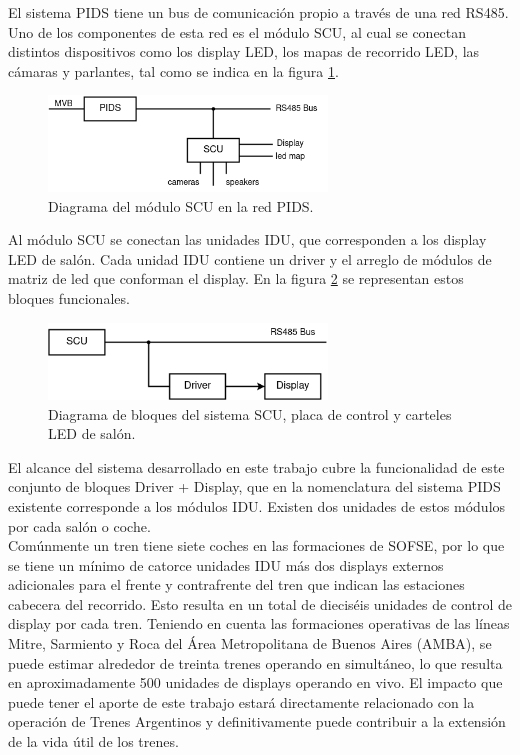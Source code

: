 El sistema PIDS tiene un bus de comunicación propio a través de una red RS485. Uno de los componentes de esta red es el módulo SCU, al cual se conectan distintos dispositivos como los display LED, los mapas de recorrido LED, las cámaras y parlantes, tal como se indica en la figura 	\ref{fig:diagPidsScuDevices}.\\


\begin{figure}[ht]
	\centering
	\includegraphics[width=0.66\textwidth]{./Figures/diagPidsScuDevices.png}
	\caption{Diagrama del módulo SCU en la red PIDS.}
	\label{fig:diagPidsScuDevices}
\end{figure}

Al módulo SCU se conectan las unidades IDU, que corresponden a los display LED de salón. Cada unidad IDU contiene un driver y el arreglo de módulos de matriz de led que conforman el display. En la figura \ref{fig:diagScuDriverDisplay} se representan estos bloques funcionales.\\


\begin{figure}[ht]
	\centering
	\includegraphics[width=0.66\textwidth]{./Figures/diagScuDriverDisplay.png}
	\caption{Diagrama de bloques del sistema SCU, placa de control y carteles LED de salón.}
	\label{fig:diagScuDriverDisplay}
\end{figure}

El alcance del sistema desarrollado en este trabajo cubre la funcionalidad de este conjunto de bloques Driver + Display, que en la nomenclatura del sistema PIDS existente corresponde a los módulos IDU. Existen dos unidades de estos módulos por cada salón o coche.\\

Comúnmente un tren tiene siete coches en las formaciones de SOFSE, por lo que se tiene un mínimo de catorce unidades IDU más dos displays externos adicionales para el frente y contrafrente del tren que indican las estaciones cabecera del recorrido. Esto resulta en un total de dieciséis unidades de control de display por cada tren. Teniendo en cuenta las formaciones operativas de las líneas Mitre, Sarmiento y Roca del Área Metropolitana de Buenos Aires (AMBA), se puede estimar alrededor de treinta trenes operando en simultáneo, lo que resulta en aproximadamente 500 unidades de displays operando en vivo. El impacto que puede tener el aporte de este trabajo estará directamente relacionado con la operación de Trenes Argentinos y definitivamente puede contribuir a la extensión de la vida útil de los trenes.\\

